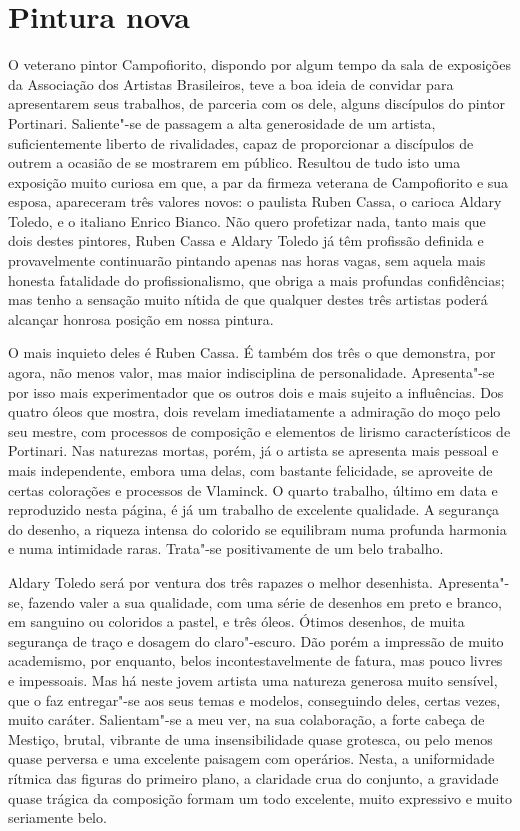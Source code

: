 \chapter{Pintura nova}

O veterano pintor Campofiorito, dispondo por algum tempo da sala de
exposições da Associação dos Artistas Brasileiros, teve a boa ideia de
convidar para apresentarem seus trabalhos, de parceria com os dele,
alguns discípulos do pintor Portinari. Saliente"-se de passagem a alta
generosidade de um artista, suficientemente liberto de rivalidades,
capaz de proporcionar a discípulos de outrem a ocasião de se mostrarem
em público. Resultou de tudo isto uma exposição muito curiosa em que, a
par da firmeza veterana de Campofiorito e sua esposa, apareceram três
valores novos: o paulista Ruben Cassa, o carioca Aldary Toledo, e o
italiano Enrico Bianco. Não quero profetizar nada, tanto mais que dois
destes pintores, Ruben Cassa e Aldary Toledo já têm profissão definida e
provavelmente continuarão pintando apenas nas horas vagas, sem aquela
mais honesta fatalidade do profissionalismo, que obriga a mais profundas
confidências; mas tenho a sensação muito nítida de que qualquer destes
três artistas poderá alcançar honrosa posição em nossa pintura.

O mais inquieto deles é Ruben Cassa. É também dos três o que demonstra,
por agora, não menos valor, mas maior indisciplina de personalidade.
Apresenta"-se por isso mais experimentador que os outros dois e mais
sujeito a influências. Dos quatro óleos que mostra, dois revelam
imediatamente a admiração do moço pelo seu mestre, com processos de
composição e elementos de lirismo característicos de Portinari. Nas
naturezas mortas, porém, já o artista se apresenta mais pessoal e mais
independente, embora uma delas, com bastante felicidade, se aproveite de
certas colorações e processos de Vlaminck. O quarto trabalho, último em
data e reproduzido nesta página, é já um trabalho de excelente
qualidade. A segurança do desenho, a riqueza intensa do colorido se
equilibram numa profunda harmonia e numa intimidade raras. Trata"-se
positivamente de um belo trabalho.

Aldary Toledo será por ventura dos três rapazes o melhor desenhista.
Apresenta"-se, fazendo valer a sua qualidade, com uma série de desenhos
em preto e branco, em sanguino ou coloridos a pastel, e três óleos.
Ótimos desenhos, de muita segurança de traço e dosagem do claro"-escuro.
Dão porém a impressão de muito academismo, por enquanto, belos
incontestavelmente de fatura, mas pouco livres e impessoais. Mas há
neste jovem artista uma natureza generosa muito sensível, que o faz
entregar"-se aos seus temas e modelos, conseguindo deles, certas vezes,
muito caráter. Salientam"-se a meu ver, na sua colaboração, a forte
cabeça de Mestiço, brutal, vibrante de uma insensibilidade quase
grotesca, ou pelo menos quase perversa e uma excelente paisagem com
operários. Nesta, a uniformidade rítmica das figuras do primeiro plano,
a claridade crua do conjunto, a gravidade quase trágica da composição
formam um todo excelente, muito expressivo e muito seriamente belo.

